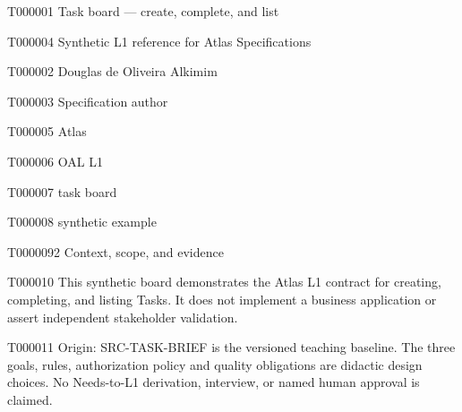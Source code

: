 \documentclass[11pt,a4paper]{article}
\begin{document}
\begin{atlastitle}{T000001}
Task board — create, complete, and list
\end{atlastitle}
\begin{atlastext}{T000004}
Synthetic L1 reference for Atlas Specifications
\end{atlastext}
\AtlasEndCover
{}
\begin{atlasitem}{T000002}
Douglas de Oliveira Alkimim
\end{atlasitem}
\begin{atlastext}{T000003}
Specification author
\end{atlastext}
\begin{atlasitem}{T000005}
Atlas
\end{atlasitem}
\begin{atlasitem}{T000006}
OAL L1
\end{atlasitem}
\begin{atlasitem}{T000007}
task board
\end{atlasitem}
\begin{atlasitem}{T000008}
synthetic example
\end{atlasitem}
\begin{atlasheading}{T000009}{2}
Context, scope, and evidence
\end{atlasheading}
\begin{atlasparagraph}{T000010}
This synthetic board demonstrates the Atlas L1 contract for creating, completing, and listing Tasks. It does not implement a business application or assert independent stakeholder validation.
\end{atlasparagraph}
\begin{atlasparagraph}{T000011}
Origin: SRC-TASK-BRIEF is the versioned teaching baseline. The three goals, rules, authorization policy and quality obligations are didactic design choices. No Needs-to-L1 derivation, interview, or named human approval is claimed.
\end{atlasparagraph}
\end{document}
